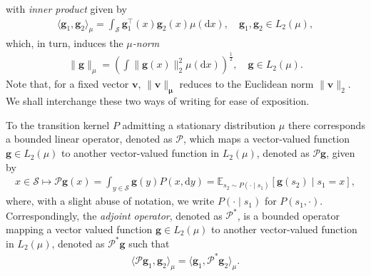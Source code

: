 with \emph{inner product} given by
\begin{align*}
\langle \bm{g}_1, \bm{g}_2 \rangle_{\mu} %
= \int_{\mathcal{S}} \bm{g}_1^\top(x)\bm{g}_2(x)\mu(\mathrm{d}x), \quad \bm{g}_1,\bm{g}_2 \in L_2(\mu),
\end{align*}
which, in turn, induces the \emph{$\mu$-norm} 
\begin{align*}
\|\bm{g}\|_{\mu} %
= \left(\int\|\bm{g}(x)\|_2^2 \mu(\mathrm{d}x)\right)^{\frac{1}{2}}, \quad \bm{g} \in L_2(\mu).
\end{align*}
Note that, for a fixed vector $\bm{v}$, $\|\bm{v}\|_{\bm{\mu}}$ reduces to the Euclidean norm $\|\bm{v}\|_{2}$. 
We shall interchange these two ways of writing for ease of exposition. 



To the transition kernel $P$ admitting a stationary distribution $\mu$ there corresponds a bounded linear operator, denoted as $\mathcal{P}$, which maps a vector-valued function $\bm{g} \in L_2(\mu)$ %
to another vector-valued function in $L_2(\mu)$, denoted as $\mathcal{P}\bm{g}$, given by
\begin{align*}
x \in \mathcal{S} \mapsto \mathcal{P}\bm{g}(x) = \int_{y \in \mathcal{S}} \bm{g}(y)P(x,\mathrm{d}y) = \mathbb{E}_{s_2 \sim P(\cdot \mid s_1)}[\bm{g}(s_2)\mid s_1 = x],
\end{align*}
where, with a slight abuse of notation, we write $P(\cdot \mid s_1)$ for $P(s_1,\cdot)$.
Correspondingly, the \emph{adjoint operator}, denoted as $\mathcal{P}^*$, is a bounded operator mapping a vector valued function $\bm{g} \in L_2(\mu)$ to another vector-valued function in $L_2(\mu)$, denoted as $\mathcal{P}^*\bm{g}$ such that 
\begin{align}\label{eq:adjoint}
\langle\mathcal{P}\bm{g}_1, \bm{g}_2\rangle_{\mu} = \langle\bm{g}_1, \mathcal{P}^*\bm{g}_2\rangle_{\mu}.
\end{align}

